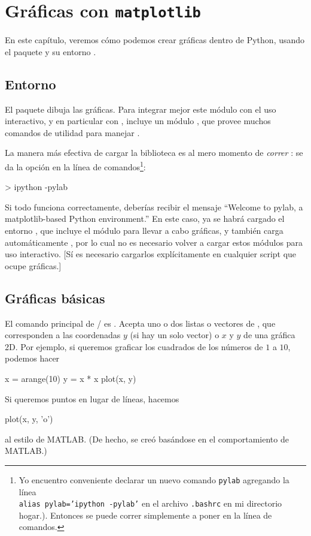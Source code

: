 \chapter{Gráficas con \texttt{matplotlib}}

En este capítulo, veremos cómo podemos crear gráficas dentro de Python, usando el paquete  y su entorno .

\section{Entorno } 
El paquete  dibuja las gráficas. Para integrar mejor este módulo con el uso interactivo, y en particular con , incluye un módulo , que provee muchos comandos de utilidad para manejar .

La manera más efectiva de cargar la biblioteca  es al mero momento de \emph{correr} : se da la opción  en la línea de comandos\footnote{Yo encuentro conveniente declarar un nuevo comando \texttt{pylab} agregando la línea \\ \texttt{alias pylab='ipython -pylab'} en el archivo \texttt{.bashrc} en mi directorio hogar.). Entonces se puede correr simplemente a poner  en la línea de comandos.}:
\begin{python}
> ipython -pylab
\end{python}
Si todo funciona correctamente, deberías recibir el mensaje
``Welcome to pylab, a matplotlib-based Python environment.'' En este caso, ya se habrá cargado el entorno , que incluye 
el módulo  para llevar a cabo gráficas, y también carga automáticamente , por lo cual no es necesario volver a cargar estos módulos para uso interactivo. [Sí es necesario cargarlos explícitamente en cualquier script que ocupe gráficas.]

\section{Gráficas básicas}
El comando principal de  /  es . Acepta uno o dos listas o vectores de , que corresponden a las coordenadas $y$ (si hay un solo vector) o $x$ y $y$ de una gráfica 2D.
Por ejemplo, si queremos graficar los cuadrados de los números de $1$ a $10$, podemos hacer
\begin{python}
x = arange(10)
y = x * x
plot(x, y)
\end{python}
Si queremos puntos en lugar de líneas, hacemos
\begin{python}
plot(x, y, 'o')
\end{python}
al estilo de MATLAB. (De hecho,  se creó basándose en el comportamiento de MATLAB.)

